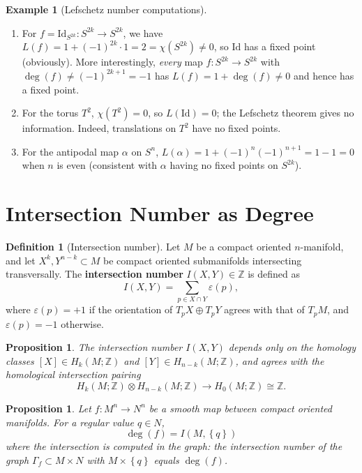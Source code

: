 \documentclass[12pt,a4paper,openany]{book}
\newtheorem{proposition}[theorem]{Proposition}
\theoremstyle{definition}
\newtheorem{definition}[theorem]{Definition}
\newtheorem{example}[theorem]{Example}
\theoremstyle{remark}
\newcommand{\Z}{\mathbb{Z}}
\newcommand{\Id}{\mathrm{Id}}
\newcommand{\set}[1]{\left\{ #1 \right\}}
\begin{document}
\begin{example}[Lefschetz number computations]\label{ex:lefschetz-computations}
\begin{enumerate}[label=(\alph*)]
  \item For $f = \Id_{S^{2k}}\colon S^{2k}\to S^{2k}$, we have
    $L(f) = 1 + (-1)^{2k}\cdot 1 = 2 = \chi(S^{2k}) \neq 0$,
    so $\Id$ has a fixed point (obviously).
    More interestingly, \emph{every} map $f\colon S^{2k}\to S^{2k}$
    with $\deg(f)\neq(-1)^{2k+1} = -1$ has $L(f) = 1+\deg(f)\neq 0$
    and hence has a fixed point.
  \item For the torus $T^2$, $\chi(T^2)=0$, so $L(\Id)=0$; the Lefschetz
    theorem gives no information. Indeed, translations on $T^2$ have
    no fixed points.
  \item For the antipodal map $\alpha$ on $S^n$,
    $L(\alpha)=1+(-1)^n(-1)^{n+1} = 1-1 = 0$ when $n$ is even (consistent
    with $\alpha$ having no fixed points on $S^{2k}$).
\end{enumerate}
\end{example}

\section{Intersection Number as Degree}\label{sec:intersection-degree}

\begin{definition}[Intersection number]\label{def:intersection-number-deg}
Let $M$ be a compact oriented $n$-manifold, and let
$X^k, Y^{n-k}\subset M$ be compact oriented submanifolds
intersecting transversally. The \textbf{intersection number}
$I(X,Y) \in \Z$ is defined as
\[
  I(X,Y) = \sum_{p \in X \cap Y} \varepsilon(p),
\]
where $\varepsilon(p) = +1$ if the orientation of $T_pX \oplus T_pY$
agrees with that of $T_pM$, and $\varepsilon(p) = -1$ otherwise.
\end{definition}

\begin{proposition}\label{prop:intersection-homotopy}
The intersection number $I(X,Y)$ depends only on the homology classes
$[X] \in H_k(M;\Z)$ and $[Y]\in H_{n-k}(M;\Z)$, and agrees with the
homological intersection pairing
\[
  H_k(M;\Z)\otimes H_{n-k}(M;\Z) \to H_0(M;\Z)\cong\Z.
\]
\end{proposition}

\begin{proposition}\label{prop:intersection-degree}
Let $f\colon M^n \to N^n$ be a smooth map between compact oriented
manifolds. For a regular value $q \in N$,
\[
  \deg(f) = I(M, \set{q})
\]
where the intersection is computed in the graph: the intersection number
of the graph $\Gamma_f \subset M \times N$ with $M \times \set{q}$
equals $\deg(f)$.
\end{proposition}
\end{document}
